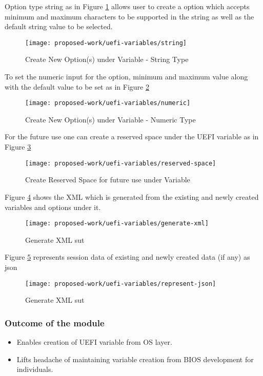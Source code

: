 Option type string as in Figure \ref{fig:uefi-variable-string} allows user to create a option which accepts minimum and maximum characters to be supported in the string as well as the default string value to be selected. 
\begin{figure}[!htbp]
	\centering
	\texttt{[image: proposed-work/uefi-variables/string]}
	\caption{Create New Option(s) under Variable - String Type}\label{fig:uefi-variable-string}
\end{figure}

To set the numeric input for the option, minimum and maximum value along with the default value to be set as in Figure \ref{fig:uefi-variable-numeric}
\begin{figure}[!htbp]
	\centering
	\texttt{[image: proposed-work/uefi-variables/numeric]}
	\caption{Create New Option(s) under Variable - Numeric Type}\label{fig:uefi-variable-numeric}
\end{figure}

For the future use one can create a reserved space under the UEFI variable as in Figure \ref{fig:uefi-variable-reserved-space}
\begin{figure}[!htbp]
	\centering
	\texttt{[image: proposed-work/uefi-variables/reserved-space]}
	\caption{Create Reserved Space for future use under Variable}\label{fig:uefi-variable-reserved-space}
\end{figure}


Figure \ref{fig:uefi-variable-generate-xml} shows the XML which is generated from the existing and newly created variables and options under it.
\begin{figure}[!htbp]
	\centering
	\texttt{[image: proposed-work/uefi-variables/generate-xml]}
	\caption{Generate XML \gls{sut}}\label{fig:uefi-variable-generate-xml}
\end{figure}

Figure \ref{fig:uefi-variable-represent-json} represents session data of existing and newly created data (if any) as json
\begin{figure}[!htbp]
	\centering
	\texttt{[image: proposed-work/uefi-variables/represent-json]}
	\caption{Generate XML \gls{sut}}\label{fig:uefi-variable-represent-json}
\end{figure}


\subsubsection{Outcome of the module}
\begin{itemize}
	\item Enables creation of UEFI variable from OS layer.
	\item Lifts headache of maintaining variable creation from BIOS development for individuals.
\end{itemize}


